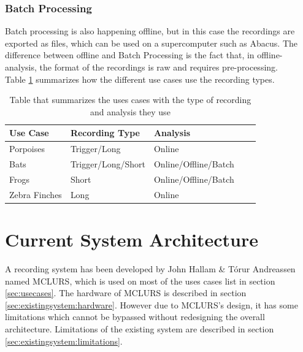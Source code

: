 \subsubsection{Batch Processing}
Batch processing is also happening offline, but in this case the recordings are exported as  files, which can be used on a supercomputer such as Abacus. The difference between offline and Batch Processing is the fact that, in offline-analysis, the format of the recordings is raw and requires pre-processing.\\

Table \ref{tab:recordingtypes:summarize} summarizes how the different use cases use the recording types.

\begin{table}[H]
\centering
\begin{tabularx}{\textwidth}{|X|X|X|X|X}
\hline
\textbf{Use Case} & \textbf{Recording Type} & \textbf{Analysis}    \\ \hline
Porpoises         & Trigger/Long            & Online               \\ \hline
Bats              & Trigger/Long/Short      & Online/Offline/Batch \\ \hline
Frogs             & Short                   & Online/Offline/Batch \\ \hline
Zebra Finches     & Long                    & Online               \\ \hline
\end{tabularx}%
\caption{Table that summarizes the uses cases with the type of recording and analysis they use}
\label{tab:recordingtypes:summarize}
\end{table}

\section{Current System Architecture}

A recording system has been developed by John Hallam \& T{\'o}rur Andreassen \citep{andreassen2013ultrasonic} named \ac{MCLURS}, which is used on most of the uses cases list in section \ref{sec:usecases}. The hardware of MCLURS is described in section \ref{sec:existingsystem:hardware}. 
However due to MCLURS's design, it has some limitations which cannot be bypassed without redesigning the overall architecture. Limitations of the existing system are described in section \ref{sec:existingsystem:limitations}.\\


